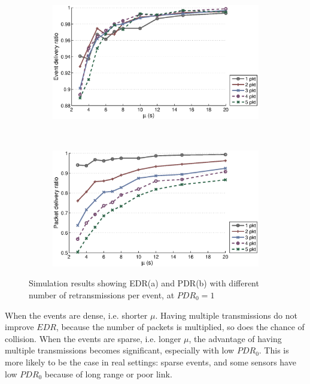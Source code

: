 \begin{figure}[p]
    \centering
    \begin{subfigure}[t]{0.9\textwidth}
        \centering
        \includegraphics[width=\textwidth] {../../sw/pc/matlab/simulation-result/retrans-count-edr-250evt-pdr1.eps}
        \caption{}
    \end{subfigure} 
    \\
    \begin{subfigure}[t]{0.9\textwidth}
        \centering
        \includegraphics[width=\textwidth] {../../sw/pc/matlab/simulation-result/retrans-count-pdr-250evt-pdr1.eps}
        \caption{}
    \end{subfigure}
    \caption[EDR and PDR with different transmission redundancy, $PDR_0 = 1$]{Simulation results showing EDR(a) and PDR(b) with different number of retransmissions per event, at $PDR_0 = 1$}\label{fig:retrans-lambda-1}
\end{figure}

When the events are dense, i.e. shorter $\mu$. Having multiple transmissions do not improve $EDR$, because the number of packets is multiplied, so does the chance of collision. When the events are sparse, i.e. longer $\mu$, the advantage of having multiple transmissions becomes significant, especially with low $PDR_0$. This is more likely to be the case in real settings: sparse events, and some sensors have low $PDR_0$ because of long range or poor link. 

